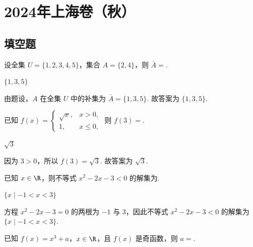 \chapter{2024年上海卷（秋）}

\section{填空题}

\begin{problem}
设全集 \(U=\{1,2,3,4,5\}\)，集合 \(A=\{2,4\}\)，则 \(\bar{A}=\)\fillinblank{}.
\end{problem}

\begin{answer}
\(\{1,3,5\}\)
\end{answer}

\begin{solution}
由题设，\(A\) 在全集 \(U\) 中的补集为
\(\bar{A}=\{1,3,5\}\).
故答案为 \(\{1,3,5\}\).
\end{solution}

\begin{problem}
已知 \(f(x)=\begin{cases}
\sqrt{x}, & x>0,\\
1, & x\le 0,
\end{cases}\) 则 \(f(3)=\)\fillinblank{}.
\end{problem}

\begin{answer}
\(\sqrt{3}\)
\end{answer}

\begin{solution}
因为 \(3>0\)，所以
\(f(3)=\sqrt{3}\).
故答案为 \(\sqrt{3}\).
\end{solution}

\begin{problem}
已知 \(x\in \R\)，则不等式 \(x^2-2x-3<0\) 的解集为\fillinblank{}.
\end{problem}

\begin{answer}
\(\{x\mid -1<x<3\}\)
\end{answer}

\begin{solution}
方程
\(x^2-2x-3=0\)
的两根为 \(-1\) 与 3，因此不等式 \(x^2-2x-3<0\) 的解集为
\(\{x\mid -1<x<3\}\).
\end{solution}

\begin{problem}
已知 \(f(x)=x^3+a\)，\(x\in \R\)，且 \(f(x)\) 是奇函数，则 \(a=\)\fillinblank{}.
\end{problem}

